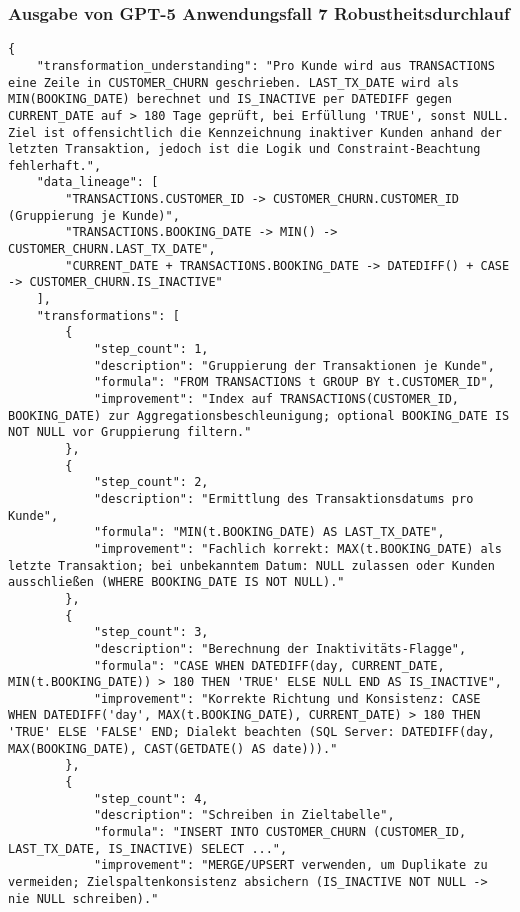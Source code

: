 \subsubsection{Ausgabe von GPT-5 Anwendungsfall 7 Robustheitsdurchlauf}\label{anhang:subsubsec:gpt_case7_prompt3}
\begin{lstlisting}[caption={Ausgabe: GPT-5 Anwendungsfall 7 Robustheitsdurchlauf},label={gpt_case7_prompt3}]
{
    "transformation_understanding": "Pro Kunde wird aus TRANSACTIONS eine Zeile in CUSTOMER_CHURN geschrieben. LAST_TX_DATE wird als MIN(BOOKING_DATE) berechnet und IS_INACTIVE per DATEDIFF gegen CURRENT_DATE auf > 180 Tage geprüft, bei Erfüllung 'TRUE', sonst NULL. Ziel ist offensichtlich die Kennzeichnung inaktiver Kunden anhand der letzten Transaktion, jedoch ist die Logik und Constraint-Beachtung fehlerhaft.",
    "data_lineage": [
        "TRANSACTIONS.CUSTOMER_ID -> CUSTOMER_CHURN.CUSTOMER_ID (Gruppierung je Kunde)",
        "TRANSACTIONS.BOOKING_DATE -> MIN() -> CUSTOMER_CHURN.LAST_TX_DATE",
        "CURRENT_DATE + TRANSACTIONS.BOOKING_DATE -> DATEDIFF() + CASE -> CUSTOMER_CHURN.IS_INACTIVE"
    ],
    "transformations": [
        {
            "step_count": 1,
            "description": "Gruppierung der Transaktionen je Kunde",
            "formula": "FROM TRANSACTIONS t GROUP BY t.CUSTOMER_ID",
            "improvement": "Index auf TRANSACTIONS(CUSTOMER_ID, BOOKING_DATE) zur Aggregationsbeschleunigung; optional BOOKING_DATE IS NOT NULL vor Gruppierung filtern."
        },
        {
            "step_count": 2,
            "description": "Ermittlung des Transaktionsdatums pro Kunde",
            "formula": "MIN(t.BOOKING_DATE) AS LAST_TX_DATE",
            "improvement": "Fachlich korrekt: MAX(t.BOOKING_DATE) als letzte Transaktion; bei unbekanntem Datum: NULL zulassen oder Kunden ausschließen (WHERE BOOKING_DATE IS NOT NULL)."
        },
        {
            "step_count": 3,
            "description": "Berechnung der Inaktivitäts-Flagge",
            "formula": "CASE WHEN DATEDIFF(day, CURRENT_DATE, MIN(t.BOOKING_DATE)) > 180 THEN 'TRUE' ELSE NULL END AS IS_INACTIVE",
            "improvement": "Korrekte Richtung und Konsistenz: CASE WHEN DATEDIFF('day', MAX(t.BOOKING_DATE), CURRENT_DATE) > 180 THEN 'TRUE' ELSE 'FALSE' END; Dialekt beachten (SQL Server: DATEDIFF(day, MAX(BOOKING_DATE), CAST(GETDATE() AS date)))."
        },
        {
            "step_count": 4,
            "description": "Schreiben in Zieltabelle",
            "formula": "INSERT INTO CUSTOMER_CHURN (CUSTOMER_ID, LAST_TX_DATE, IS_INACTIVE) SELECT ...",
            "improvement": "MERGE/UPSERT verwenden, um Duplikate zu vermeiden; Zielspaltenkonsistenz absichern (IS_INACTIVE NOT NULL -> nie NULL schreiben)."

\end{lstlisting}
